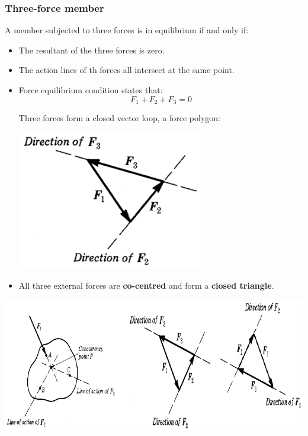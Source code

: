 \documentclass[11pt]{article}
\begin{document}
\subsubsection{Three-force member}
\label{sec:orgc1b4577}
A member subjected to three forces is in equilibrium if and only if:
\begin{itemize}
\item The resultant of the three forces is zero.
\item The action lines of th forces all intersect at the same point.
\item Force equilibrium condition states that:
\[F_1 + F_2 + F_3 = 0\]

Three forces form a closed vector loop, a force polygon:
\begin{center}
\includegraphics[width=.9\linewidth]{./images/three-force-member-force-polygon.png}
\end{center}

\item All three external forces are \textbf{co-centred} and form a \textbf{closed triangle}.
\end{itemize}

\begin{center}
\includegraphics[width=.9\linewidth]{./images/free-body-diagram-three-force-member.png}
\end{center}
\end{document}
